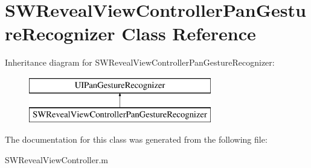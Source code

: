 \hypertarget{interface_s_w_reveal_view_controller_pan_gesture_recognizer}{}\section{S\+W\+Reveal\+View\+Controller\+Pan\+Gesture\+Recognizer Class Reference}
\label{interface_s_w_reveal_view_controller_pan_gesture_recognizer}
Inheritance diagram for S\+W\+Reveal\+View\+Controller\+Pan\+Gesture\+Recognizer\+:\begin{figure}[H]
\begin{center}
\leavevmode
\includegraphics[height=2.000000cm]{interface_s_w_reveal_view_controller_pan_gesture_recognizer}
\end{center}
\end{figure}


The documentation for this class was generated from the following file\+:\begin{DoxyCompactItemize}
\item 
S\+W\+Reveal\+View\+Controller.\+m\end{DoxyCompactItemize}

